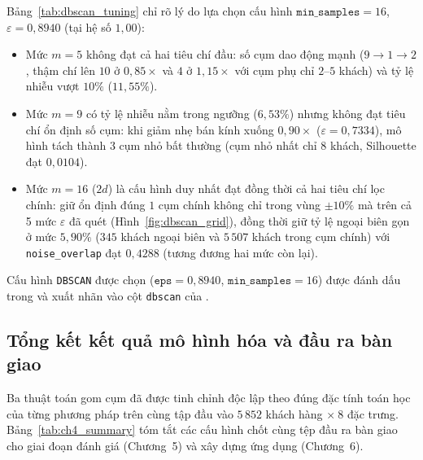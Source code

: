 \documentclass[12pt,a4paper]{article}
\numberwithin{equation}{section}
\numberwithin{table}{section}
\numberwithin{figure}{section}
\begin{document}
Bảng~\ref{tab:dbscan_tuning} chỉ rõ lý do lựa chọn cấu hình $\texttt{min\_samples} = 16$, $\varepsilon = 0,8940$ (tại hệ số $1,00$):
\begin{itemize}[leftmargin=1.5em]
    \item Mức $m = 5$ không đạt cả hai tiêu chí đầu: số cụm dao động mạnh ($9 \to 1 \to 2$, thậm chí lên $10$ ở $0,85\times$ và $4$ ở $1,15\times$ với cụm phụ chỉ $2\text{--}5$ khách) và tỷ lệ nhiễu vượt $10\%$ ($11,55\%$).
    \item Mức $m = 9$ có tỷ lệ nhiễu nằm trong ngưỡng ($6,53\%$) nhưng không đạt tiêu chí ổn định số cụm: khi giảm nhẹ bán kính xuống $0,90\times$ ($\varepsilon = 0,7334$), mô hình tách thành $3$ cụm nhỏ bất thường (cụm nhỏ nhất chỉ $8$ khách, Silhouette đạt $0,0104$).
    \item Mức $m = 16$ ($2d$) là cấu hình duy nhất đạt đồng thời cả hai tiêu chí lọc chính: giữ ổn định đúng $1$ cụm chính không chỉ trong vùng $\pm 10\%$ mà trên cả 5 mức $\varepsilon$ đã quét (Hình~\ref{fig:dbscan_grid}), đồng thời giữ tỷ lệ ngoại biên gọn ở mức $5,90\%$ ($345$ khách ngoại biên và $5\,507$ khách trong cụm chính) với \texttt{noise\_overlap} đạt $0,4288$ (tương đương hai mức còn lại).
\end{itemize}

Cấu hình \texttt{DBSCAN} được chọn ($\texttt{eps} = 0,8940$, $\texttt{min\_samples} = 16$) được đánh dấu trong  và xuất nhãn vào cột \texttt{dbscan} của .

\subsection{Tổng kết kết quả mô hình hóa và đầu ra bàn giao}

Ba thuật toán gom cụm đã được tinh chỉnh độc lập theo đúng đặc tính toán học của từng phương pháp trên cùng tập đầu vào $5\,852$ khách hàng $\times\ 8$ đặc trưng. Bảng~\ref{tab:ch4_summary} tóm tắt các cấu hình chốt cùng tệp đầu ra bàn giao cho giai đoạn đánh giá (Chương~5) và xây dựng ứng dụng (Chương~6).
\end{document}
